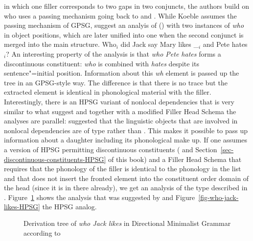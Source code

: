 in which one filler corresponds to two gaps in two conjuncts, the authors build on \citet{Kobele2008a}
who uses a \slasch passing mechanism going back to \citet{Sag83a-u} and \citet{Gazdar81a}. While
Koeble assumes the \slasch passing mechanism of GPSG, \citet{TS2016a} suggest an analyis of
() with two instances of \emph{who} in object positions, which are later unified into one when the second conjunct is merged
into the main structure. 
\ea
Who$_i$ did Jack say Mary likes \_$_i$ and Pete hates $_i$?
\z  
An interesting property of the analysis is that \emph{who Pete hates} forms a discontinuous
constituent: \emph{who} is combined with \emph{hates} despite its sentence"=initial
position. Information about this \emph{wh} element is passed up the tree in an GPSG-style way. The
difference is that there is no trace but the extracted element is identical in phonological material
with the filler. Interestingly, there is an HPSG variant of nonlocal dependencies that is very
similar to what \citet{TS2016a} suggest and together with a modified Filler Head Schema the analyses
are parallel: \citet{HN94b} suggested that the linguistic objects that are involved in nonlocal
dependencies are of type  rather than . This makes it possible to pass up
information about a daughter including its phonological make up. If one assumes a version of HPSG
permitting discontinuous constituents (\citealp{Reape94a,Kathol2001a,Mueller95c,Mueller2004b} and
Section~\ref{sec-discontinuous-constituents-HPSG} of this book) and a Filler
Head Schema that requires that the phonology of the filler is identical to the phonology in the
\slasch list and that does not insert the fronted element into the constituent order domain of the
head (since it is in there already), we get an analysis of the type described in
\citet{TS2016a}. Figure~\ref{fig-who-jack-likes-DMG} shows the analysis that was suggested by
\citet{TS2016a} and Figure~\ref{fig-who-jack-likes-HPSG} the HPSG analog.
\begin{figure}
\caption{Derivation tree of \emph{who Jack likes} in Directional Minimalist Grammar according to \citet{TS2016a}}\label{fig-who-jack-likes-DMG}
\end{figure}
